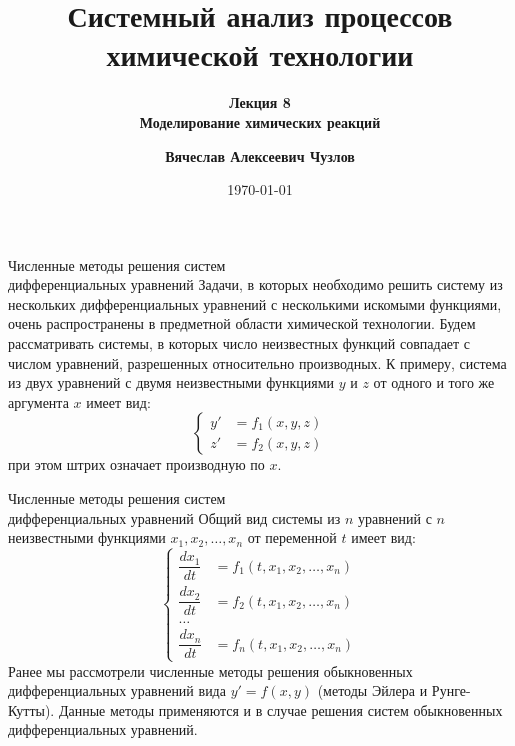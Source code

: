 \documentclass[aspectratio=169, mathserif]{beamer}	%
\title{\LARGE{Системный анализ процессов химической технологии}}
\subtitle{\textcolor{tpugreen}{\textbf{Лекция 8}} \\ \textbf{Моделирование химических реакций}}
\author[]{\textbf{Вячеслав Алексеевич Чузлов}}
\institute{к.т.н., доцент ОХИ ИШПР}
\date{\today}
\begin{document}

\titleframe		%

\tocframe{}		%



\begin{frame}[fragile, label=c]{Численные методы решения систем \\ дифференциальных уравнений}
\scriptsize
Задачи, в которых необходимо решить систему из нескольких дифференциальных уравнений с несколькими искомыми функциями, очень распространены в предметной области химической технологии.
\vfill
Будем рассматривать системы, в которых число неизвестных функций совпадает с числом уравнений, разрешенных относительно производных.
\vfill
К примеру, система из двух уравнений с двумя неизвестными функциями $y$ и $z$ от одного и того же аргумента $x$ имеет вид:
\vfill
\begin{equation}\label{system-ODE}
	\left\{
	\begin{aligned}
		y' &= f_1\left(x, y, z\right)\\
		z' &= f_2\left(x, y, z\right)
	\end{aligned}
	\right.
\end{equation}
\vfill
\noindent при этом штрих означает производную по $x$.
\vfill
\end{frame}


\begin{frame}[fragile, label=c]{Численные методы решения систем \\ дифференциальных уравнений}
\scriptsize
Общий вид системы из $n$ уравнений с $n$ неизвестными функциями $x_1, x_2, \ldots, x_n$ от переменной $t$ имеет вид:
\vfill
\begin{equation}\label{system-ODE2}
	\left\{
	\begin{aligned}
		\dfrac{dx_1}{dt} &= f_1\left(t, x_1, x_2, \ldots, x_n\right) \\
		\dfrac{dx_2}{dt} &= f_2\left(t, x_1, x_2, \ldots, x_n\right) \\
		\ldots & \\
		\dfrac{dx_n}{dt} &= f_n\left(t, x_1, x_2, \ldots, x_n\right)
	\end{aligned}
	\right.
\end{equation}
\vfill
Ранее мы рассмотрели численные методы решения обыкновенных дифференциальных уравнений вида $y'=f(x,y)$ (методы Эйлера и Рунге-Кутты). Данные методы применяются и в случае решения систем обыкновенных дифференциальных уравнений.
\vfill
\end{frame}
\end{document}

